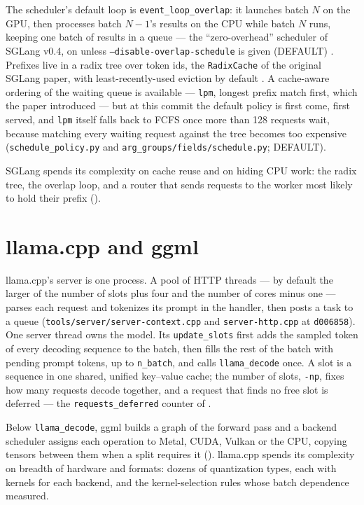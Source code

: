The scheduler's default loop is \texttt{event\_loop\_overlap}: it launches batch
$N$ on the GPU, then processes batch $N - 1$'s results on the CPU while batch $N$
runs, keeping one batch of results in a queue --- the ``zero-overhead'' scheduler
of SGLang v0.4, on unless \texttt{--disable-overlap-schedule} is given
(DEFAULT) \cite{sglang2024v04}. Prefixes live in a radix tree over token ids,
the \texttt{RadixCache} of the original SGLang paper, with least-recently-used
eviction by default \cite{zheng2023sglang}. A cache-aware ordering of the waiting
queue is available --- \texttt{lpm}, longest prefix match first, which the
paper introduced --- but at this commit the default policy is first come, first
served, and \texttt{lpm} itself falls back to FCFS once more than 128 requests
wait, because matching every waiting request against the tree becomes too
expensive (\texttt{schedule\_policy.py} and \texttt{arg\_groups/fields/schedule.py};
DEFAULT).

SGLang spends its complexity on cache reuse and on hiding CPU work: the radix
tree, the overlap loop, and a router that sends requests to the worker most
likely to hold their prefix ().

\section{llama.cpp and ggml}

llama.cpp's server is one process. A pool of HTTP threads --- by default the
larger of the number of slots plus four and the number of cores minus one ---
parses each request and tokenizes its prompt in the handler, then posts a task to
a queue (\texttt{tools/server/server-context.cpp} and \texttt{server-http.cpp} at
\texttt{d006858}). One server thread owns the model. Its \texttt{update\_slots}
first adds the sampled token of every decoding sequence to the batch, then
fills the rest of the batch with pending prompt tokens, up to \texttt{n\_batch},
and calls \texttt{llama\_decode} once. A slot is a sequence in one shared,
unified key--value cache; the number of slots, \texttt{-np}, fixes how many
requests decode together, and a request that finds no free slot is deferred ---
the \texttt{requests\_deferred} counter of .

Below \texttt{llama\_decode}, ggml builds a graph of the forward pass and a
backend scheduler assigns each operation to Metal, CUDA, Vulkan or the CPU,
copying tensors between them when a split requires it ().
llama.cpp spends its complexity on breadth of hardware and formats: dozens of
quantization types, each with kernels for each backend, and the kernel-selection
rules whose batch dependence  measured.

